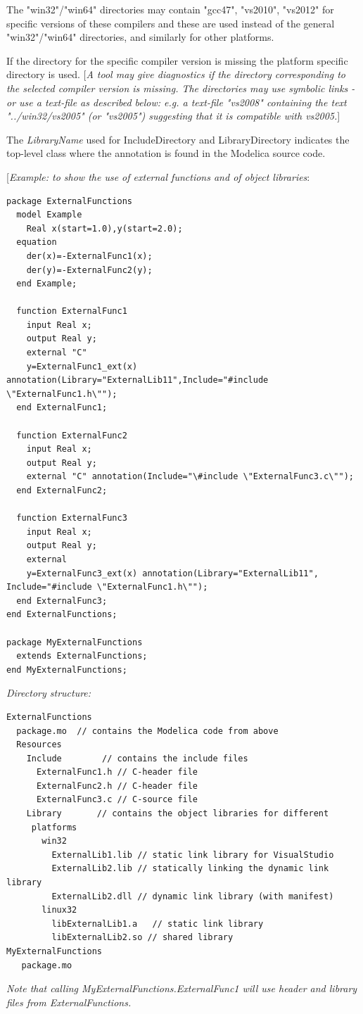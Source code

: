 \documentclass[10pt,a4paper]{report}
\begin{document}
The "win32"/"win64" directories may contain "gcc47", "vs2010", "vs2012"
for specific versions of these compilers and these are used instead of
the general "win32"/"win64" directories, and similarly for other
platforms.

If the directory for the specific compiler version is missing the
platform specific directory is used. {[}\emph{A tool may give
diagnostics if the directory corresponding to the selected compiler
version is missing. The directories may use symbolic links - or use a
text-file as described below: e.g. a text-file "vs2008" containing the
text "../win32/vs2005" (or "vs2005") suggesting that it is compatible
with vs2005.}{]}

The \emph{LibraryName} used for IncludeDirectory and LibraryDirectory
indicates the top-level class where the annotation is found in the
Modelica source code.

{[}\emph{Example: to show the use of external functions and of object
libraries}:

\begin{lstlisting}[language=modelica]
package ExternalFunctions
  model Example
    Real x(start=1.0),y(start=2.0);
  equation
    der(x)=-ExternalFunc1(x);
    der(y)=-ExternalFunc2(y);
  end Example;

  function ExternalFunc1
    input Real x;
    output Real y;
    external "C"
    y=ExternalFunc1_ext(x) annotation(Library="ExternalLib11",Include="#include \"ExternalFunc1.h\"");
  end ExternalFunc1;

  function ExternalFunc2
    input Real x;
    output Real y;
    external "C" annotation(Include="\#include \"ExternalFunc3.c\"");
  end ExternalFunc2;

  function ExternalFunc3
    input Real x;
    output Real y;
    external
    y=ExternalFunc3_ext(x) annotation(Library="ExternalLib11", Include="#include \"ExternalFunc1.h\"");
  end ExternalFunc3;
end ExternalFunctions;

package MyExternalFunctions
  extends ExternalFunctions;
end MyExternalFunctions;
\end{lstlisting}
\emph{Directory structure:}

\textbf{}

\begin{lstlisting}[language=modelica]
ExternalFunctions
  package.mo  // contains the Modelica code from above
  Resources
    Include        // contains the include files
      ExternalFunc1.h // C-header file
      ExternalFunc2.h // C-header file
      ExternalFunc3.c // C-source file
    Library       // contains the object libraries for different
     platforms
       win32
         ExternalLib1.lib // static link library for VisualStudio
         ExternalLib2.lib // statically linking the dynamic link library
         ExternalLib2.dll // dynamic link library (with manifest)
       linux32
         libExternalLib1.a   // static link library
         libExternalLib2.so // shared library
MyExternalFunctions
   package.mo
\end{lstlisting}
\emph{Note that calling MyExternalFunctions.ExternalFunc1 will use
header and library files from ExternalFunctions.}
\end{document}
